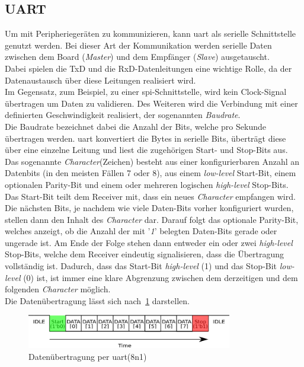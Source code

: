 \subsection{UART}\label{kap:uart}

Um mit Peripheriegeräten zu kommunizieren, kann \ac{uart} als serielle Schnittstelle genutzt werden.
Bei dieser Art der Kommunikation werden serielle Daten zwischen dem Board (\emph{Master})
und dem Empfänger (\emph{Slave}) ausgetauscht. \\
Dabei spielen die TxD und die RxD-Datenleitungen
eine wichtige Rolle, da der Datenaustausch über diese Leitungen realisiert wird.\\
Im Gegensatz, zum Beispiel, zu einer \ac{spi}-Schnittstelle, wird kein Clock-Signal
übertragen um Daten zu validieren. Des Weiteren wird die Verbindung mit einer definierten
Geschwindigkeit realisiert, der sogenannten \emph{Baudrate}.~\cite{uartpdf} \\
Die Baudrate bezeichnet dabei die Anzahl der Bits, welche pro Sekunde übertragen werden.
\ac{uart} konvertiert die Bytes in serielle Bits, überträgt diese über eine einzelne Leitung
und liest die zugehörigen Start- und Stop-Bits aus.\\
Das sogenannte \emph{Character}(Zeichen) besteht aus einer konfigurierbaren Anzahl an Datenbits (in den meisten
Fällen 7 oder 8), aus einem \emph{low-level} Start-Bit, einem optionalen Parity-Bit und einem
oder mehreren logischen \emph{high-level} Stop-Bits.\\
Das Start-Bit teilt dem Receiver mit, dass ein neues \emph{Character} empfangen wird.
Die nächsten Bits, je nachdem wie viele Daten-Bits vorher konfiguriert wurden, stellen
dann den Inhalt des \emph{Character} dar. Darauf folgt das optionale Parity-Bit,
welches anzeigt, ob die Anzahl der mit '\emph{1}' belegten Daten-Bits gerade oder
ungerade ist. Am Ende der Folge stehen dann entweder ein oder zwei  \emph{high-level } Stop-Bits,
welche dem Receiver eindeutig signalisieren, dass die Übertragung vollständig ist. Dadurch,
dass das Start-Bit \emph{high-level} (1) und das Stop-Bit \emph{low-level} (0) ist,
ist immer eine klare Abgrenzung zwischen dem derzeitigen und dem folgenden \emph{Character} möglich.\\

Die Datenübertragung lässt sich nach~\ref{fig:uart} darstellen.\\

\begin{figure}[h!]
\centering
\includegraphics[width=0.8\textwidth]{Hauptteil/uart.eps}
\caption{Datenübertragung per \ac{uart}(8n1) }
\label{fig:uart}
\end{figure}





